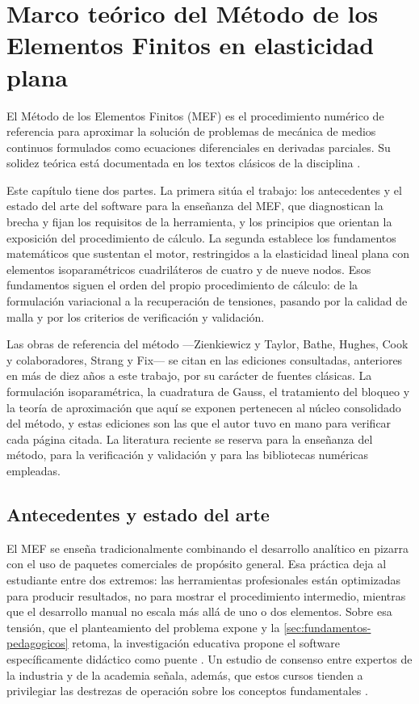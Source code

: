 \chapter{Marco teórico del Método de los Elementos Finitos en elasticidad plana}
\label{cap:marco_teorico}

El Método de los Elementos Finitos (MEF) es el procedimiento numérico de referencia para aproximar la solución de problemas de mecánica de medios continuos formulados como ecuaciones diferenciales en derivadas parciales. Su solidez teórica está documentada en los textos clásicos de la disciplina \autocite{zienkiewicz2013fem,bathe2014fem,cook2002concepts}.

Este capítulo tiene dos partes. La primera sitúa el trabajo: los antecedentes y el estado del arte del software para la enseñanza del MEF, que diagnostican la brecha y fijan los requisitos de la herramienta, y los principios que orientan la exposición del procedimiento de cálculo. La segunda establece los fundamentos matemáticos que sustentan el motor, restringidos a la elasticidad lineal plana con elementos isoparamétricos cuadriláteros de cuatro y de nueve nodos. Esos fundamentos siguen el orden del propio procedimiento de cálculo: de la formulación variacional a la recuperación de tensiones, pasando por la calidad de malla y por los criterios de verificación y validación.

Las obras de referencia del método —Zienkiewicz y Taylor, Bathe, Hughes, Cook y colaboradores, Strang y Fix— se citan en las ediciones consultadas, anteriores en más de diez años a este trabajo, por su carácter de fuentes clásicas. La formulación isoparamétrica, la cuadratura de Gauss, el tratamiento del bloqueo y la teoría de aproximación que aquí se exponen pertenecen al núcleo consolidado del método, y estas ediciones son las que el autor tuvo en mano para verificar cada página citada. La literatura reciente se reserva para la enseñanza del método, para la verificación y validación y para las bibliotecas numéricas empleadas.

\section{Antecedentes y estado del arte}
\label{sec:antecedentes}

El MEF se enseña tradicionalmente combinando el desarrollo analítico en pizarra con el uso de paquetes comerciales de propósito general. Esa práctica deja al estudiante entre dos extremos: las herramientas profesionales están optimizadas para producir resultados, no para mostrar el procedimiento intermedio, mientras que el desarrollo manual no escala más allá de uno o dos elementos. Sobre esa tensión, que el planteamiento del problema expone y la \autoref{sec:fundamentos-pedagogicos} retoma, la investigación educativa propone el software específicamente didáctico como puente \autocite{bishay2020teaching,lee2015interactive,perezsantiago2023fem}. Un estudio de consenso entre expertos de la industria y de la academia señala, además, que estos cursos tienden a privilegiar las destrezas de operación sobre los conceptos fundamentales \autocite[p.~1159]{perezsantiago2023fem}.


